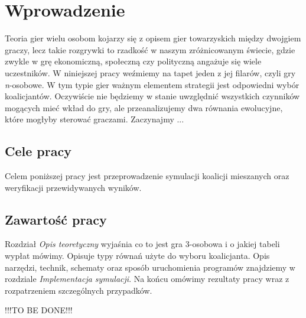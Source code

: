 \chapter{Wprowadzenie}
\label{cha:wprowadzenie}

Teoria gier wielu osobom kojarzy się z opisem gier towarzyskich między dwojgiem graczy, lecz takie rozgrywki to rzadkość w naszym zróżnicowanym świecie, gdzie zwykle w grę ekonomiczną, społeczną czy polityczną angażuje się wiele uczestników. 
W niniejszej pracy weźmiemy na tapet jeden z jej filarów, czyli gry \textit{n}-osobowe. W tym typie gier ważnym elementem strategii jest odpowiedni wybór koalicjantów. Oczywiście nie będziemy w stanie uwzględnić wszystkich czynników mogących mieć wkład do gry, ale przeanalizujemy dwa równania ewolucyjne, które mogłyby sterować graczami. Zaczynajmy ...


\section{Cele pracy}
\label{sec:celePracy}

Celem poniższej pracy jest przeprowadzenie symulacji koalicji mieszanych oraz weryfikacji przewidywanych wyników.



\section{Zawartość pracy}
\label{sec:zawartoscPracy}
Rozdział \textit{Opis teoretyczny} wyjaśnia co to jest gra 3-osobowa i o jakiej tabeli wypłat mówimy. Opisuje typy równań użyte do wyboru koalicjanta. Opis narzędzi, technik, schematy oraz sposób uruchomienia programów znajdziemy w rozdziale \textit{Implementacja symulacji}. Na końcu omówimy rezultaty pracy wraz z rozpatrzeniem szczególnych przypadków.

!!!TO BE DONE!!! \cite{Now06} \cite{Hof98} \cite{Str01} \cite{Qt} \cite{Tut} \cite{Sza}
